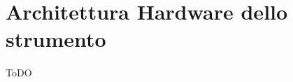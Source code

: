 \chapter{Architettura Hardware dello strumento}
\label{capitolo3}
\thispagestyle{empty}

\noindent ToDO


